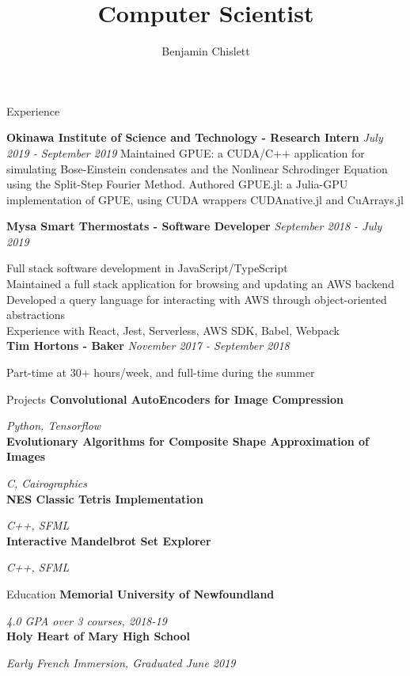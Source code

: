 \documentclass[11pt, letterpaper]{article}
\title{Computer Scientist}
\author{Benjamin Chislett}
\date{}
\begin{document}
\begin{center}
  \Huge\theauthor
  \par
  \huge\thetitle
  \par
\end{center}

\begin{section}{Experience}

\textbf{Okinawa Institute of Science and Technology - Research Intern}
\hfill
\textit{July 2019 - September 2019}
Maintained GPUE: a CUDA/C++ application for simulating Bose-Einstein condensates and the Nonlinear Schrodinger Equation using the Split-Step Fourier Method.
Authored GPUE.jl: a Julia-GPU implementation of GPUE, using CUDA wrappers CUDAnative.jl and CuArrays.jl

\textbf{Mysa Smart Thermostats - Software Developer}
\hfill
\textit{September 2018 - July 2019}

Full stack software development in JavaScript/TypeScript\\
Maintained a full stack application for browsing and updating an AWS backend\\
Developed a query language for interacting with AWS through object-oriented abstractions\\
Experience with React, Jest, Serverless, AWS SDK, Babel, Webpack\\

\textbf{Tim Hortons - Baker}
\textit{November 2017 - September 2018}

Part-time at 30+ hours/week, and full-time during the summer
\end{section}

\begin{section}{Projects}
\textbf{Convolutional AutoEncoders for Image Compression}

\textit{Python, Tensorflow}\\

\textbf{Evolutionary Algorithms for Composite Shape Approximation of Images}

\textit{C, Cairographics}\\

\textbf{NES Classic Tetris Implementation}

\textit{C++, SFML}\\

\textbf{Interactive Mandelbrot Set Explorer}

\textit{C++, SFML}
\end{section}

\begin{section}{Education}
\textbf{Memorial University of Newfoundland}

\textit{4.0 GPA over 3 courses, 2018-19}\\

\textbf{Holy Heart of Mary High School}

\textit{Early French Immersion, Graduated June 2019}
\end{section}
\end{document}
